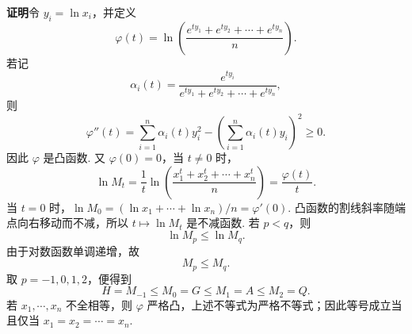\documentclass[UTF8, 12pt, fontset=fandol, oneside]{ctexart}
\begin{document}
\noindent\textbf{证明}\quad 令 $y_i=\ln x_i$，并定义
\[
  \varphi(t)=\ln\left(\frac{e^{t y_1}+e^{t y_2}+\cdots+e^{t y_n}}{n}\right).
\]
若记
\[
  \alpha_i(t)=\frac{e^{t y_i}}{e^{t y_1}+e^{t y_2}+\cdots+e^{t y_n}},
\]
则
\[
  \varphi''(t)
  =\sum_{i=1}^n\alpha_i(t)y_i^2
  -\left(\sum_{i=1}^n\alpha_i(t)y_i\right)^2\ge0.
\]
因此 $\varphi$ 是凸函数. 又 $\varphi(0)=0$，当 $t\ne0$ 时，
\[
  \ln M_t
  =\frac{1}{t}\ln\left(\frac{x_1^t+x_2^t+\cdots+x_n^t}{n}\right)
  =\frac{\varphi(t)}{t}.
\]
当 $t=0$ 时，$\ln M_0=(\ln x_1+\cdots+\ln x_n)/n=\varphi'(0)$. 凸函数的割线斜率随端点向右移动而不减，所以 $t\mapsto \ln M_t$ 是不减函数. 若 $p<q$，则
\[
  \ln M_p\le \ln M_q.
\]
由于对数函数单调递增，故
\[
  M_p\le M_q.
\]
取 $p=-1,0,1,2$，便得到
\[
  H=M_{-1}\le M_0=G\le M_1=A\le M_2=Q.
\]
若 $x_1,\cdots,x_n$ 不全相等，则 $\varphi$ 严格凸，上述不等式为严格不等式；因此等号成立当且仅当 $x_1=x_2=\cdots=x_n$.

\endgroup
\end{document}
